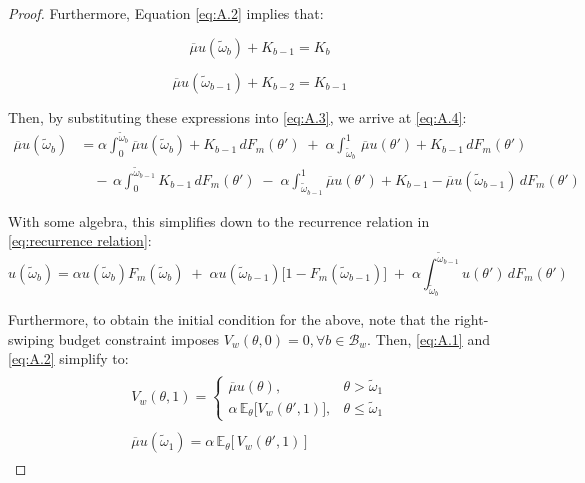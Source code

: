 \begin{proof}
Furthermore, Equation \ref{eq:A.2} implies that:

$$
\overline\mu u(\widetilde\omega_b) +K_{b-1}= K_b
$$

$$
\overline\mu u(\widetilde\omega_{b-1}) +K_{b-2}=K_{b-1}
$$

Then, by substituting these expressions into \ref{eq:A.3}, we arrive at \ref{eq:A.4}: 
\begin{equation}\label{eq:A.4}
    \begin{split}
        \overline\mu u(\widetilde\omega_b) &=\alpha \int^{\widetilde\omega_b}_0 \overline\mu u(\widetilde\omega_b) +K_{b-1}\,dF_m(\theta') \;+\; \alpha \int^1_{\widetilde\omega_b} \,\overline\mu u(\theta') + K_{b-1}\,dF_m(\theta')\\ 
                                           & \quad -\,\alpha \int^{\widetilde\omega_{b-1}}_0 K_{b-1}\,dF_m(\theta') \;-\; \alpha \int^1_{\widetilde\omega_{b-1}} \overline\mu u(\theta') + K_{b-1}-\overline\mu u(\widetilde\omega_{b-1})\,dF_m(\theta')
    \end{split}
\end{equation}

With some algebra, this simplifies down to the recurrence relation in \autoref{eq:recurrence relation}:  
\begin{equation}
    u(\widetilde\omega_b)=\alpha   u(\widetilde\omega_b)F_m(\widetilde\omega_b) \;+\; \alpha  u(\widetilde\omega_{b-1})\Big[1  - F_m(\widetilde\omega_{b-1})\Big] \;+\; \alpha\int^{\widetilde\omega_{b-1}}_{\widetilde\omega_b} u(\theta') \,dF_m(\theta') 
\end{equation}

Furthermore, to obtain the initial condition for the above, note that the right-swiping budget constraint imposes $V_w(\theta,0)=0, \forall b\in \mathcal{B}_w$. Then, \ref{eq:A.1} and \ref{eq:A.2} simplify to: 
\begin{align}
    \begin{split}\label{eq:A.5} 
        V_w(\theta, 1)=\begin{cases} 
            \overline\mu u(\theta),& \theta> \widetilde \omega_1 \\[6pt] 
            \alpha \,\mathbb{E}_{\theta}\Big[V_w(\theta', 1)\Big],& \theta\leq\widetilde \omega_1
        \end{cases}
    \end{split}\\[10pt]
    \begin{split}\label{eq:A.6}
        \overline\mu u(\widetilde\omega_1) = \alpha \, \mathbb{E}_\theta\Big[\,V_w(\theta',1)\,\Big] 
    \end{split} 
\end{align}


\end{proof}

